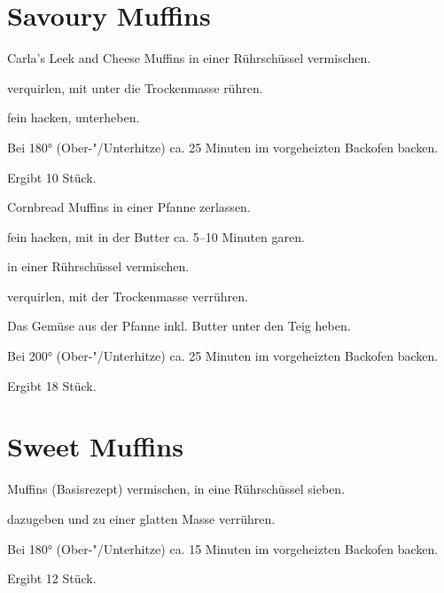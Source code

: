 \section{Savoury Muffins}

\begin{recipe}{Carla's Leek and Cheese Muffins}
  in einer Rührschüssel vermischen.

  verquirlen, mit
  unter die Trockenmasse rühren.

  fein hacken, unterheben.

  Bei 180° (Ober-"/Unterhitze) ca. 25 Minuten im vorgeheizten
  Backofen backen.
  
  Ergibt 10 Stück.
\end{recipe}

\begin{recipe}{Cornbread Muffins}
  in einer Pfanne zerlassen.

  fein hacken, mit
  in der Butter ca. 5–10 Minuten garen.

  in einer Rührschüssel vermischen.

  verquirlen, mit der Trockenmasse verrühren.

  Das Gemüse aus der Pfanne inkl. Butter unter den Teig heben.
  
  Bei 200° (Ober-"/Unterhitze) ca. 25 Minuten im vorgeheizten
  Backofen backen.
  
  Ergibt 18 Stück.
\end{recipe}


\section{Sweet Muffins}

\begin{recipe}{Muffins (Basisrezept)}
  vermischen, in eine Rührschüssel sieben.
  
  dazugeben und zu einer glatten Masse verrühren.

  Bei 180° (Ober-"/Unterhitze) ca. 15 Minuten im vorgeheizten
  Backofen backen.
  
  Ergibt 12 Stück.
\end{recipe}
  
